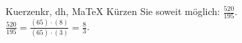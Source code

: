 \begin{MAufgabe}{Kuerzen}{kr, dh, MaTeX}
K\"urzen Sie soweit m\"oglich: $\frac{520}{195}$.\\ 
\ifLsg\MLoesung
\quad $\frac{520}{195}=\frac{(65)\cdot(8)}{(65)\cdot(3)}=\frac{8}{3}$.\else\relax\fi
 \end{MAufgabe}